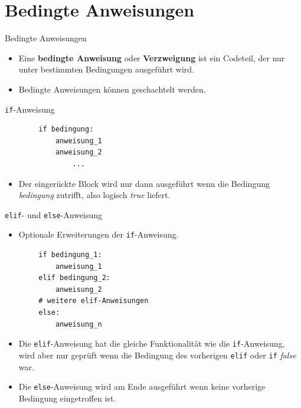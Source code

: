 \documentclass[utf8, smaller, c]{beamer}
\renewcommand{\tt}[1]{{\texttt{#1}}}
\begin{document}
\section{Bedingte Anweisungen}
\begin{frame}{Bedingte Anweisungen}
	\begin{itemize}
		\item	Eine \textbf{bedingte Anweisung} oder \textbf{Verzweigung} ist ein Codeteil, der nur unter bestimmten Bedingungen ausgeführt wird.
		\item Bedingte Anweisungen können geschachtelt werden.
	\end{itemize}
	\begin{block}{\tt{if}-Anweisung}
		\begin{lstlisting}
		if bedingung:
			anweisung_1
			anweisung_2
				...
		\end{lstlisting}
		\begin{itemize}
			\item Der eingerückte Block wird nur dann ausgeführt wenn die Bedingung \textit{bedingung} zutrifft, also logisch \textit{true} liefert.
		\end{itemize}
	\end{block}
	\pagebreak
	\begin{block}{\tt{elif}- und \tt{else}-Anweisung}
		\begin{itemize}
			\item Optionale Erweiterungen der \tt{if}-Anweisung.
		\end{itemize}
		\begin{lstlisting}
		if bedingung_1:
			anweisung_1
		elif bedingung_2:
			anweisung_2
		# weitere elif-Anweisungen
		else:
			anweisung_n
		\end{lstlisting}
		\begin{itemize}
			\item Die \tt{elif}-Anweisung hat die gleiche Funktionalität wie die \tt{if}-Anweisung, wird aber nur geprüft wenn die Bedingung des vorherigen \tt{elif} oder \tt{if} \textit{false} war.
			\item Die \tt{else}-Anweisung wird am Ende ausgeführt wenn keine vorherige Bedingung eingetroffen ist.
		\end{itemize}
	\end{block}
\end{frame}
\end{document}
